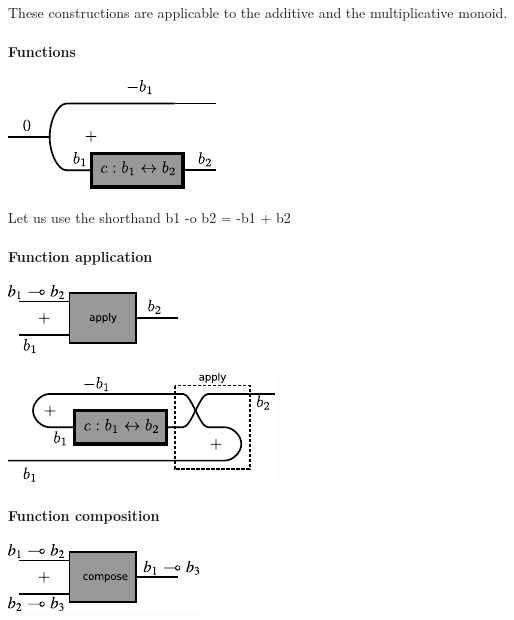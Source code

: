 \documentclass[preprint]{sigplanconf}
\begin{document}
{These constructions are applicable to the additive and the
multiplicative monoid.

\paragraph*{Functions}

\begin{center}
  \includegraphics{diagrams/function.pdf}
\end{center}

Let us use the shorthand {{b1 -o b2 = -b1 + b2}}

\paragraph*{Function application}

\begin{center}
  \includegraphics{diagrams/apply1.pdf}
\end{center}

\begin{center}
  \includegraphics{diagrams/apply2.pdf}
\end{center}

\paragraph*{Function composition}

\begin{center}
  \includegraphics{diagrams/compose1.pdf}
\end{center}

}
\end{document}
